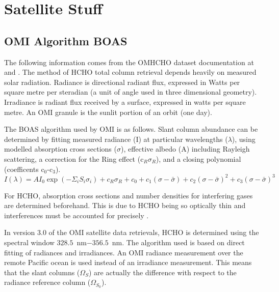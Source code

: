 \section{Satellite Stuff}
  \label{SuppNotes:Satellite}
  \subsection{OMI Algorithm BOAS}
    \label{SuppNotes:Satellite:OMI_BOAS}
    The following information comes from the OMHCHO dataset documentation at \citet{Kurosu2014} and \citet{Chance2002}.
    The method of HCHO total column retrieval depends heavily on measured solar radiation.
    Radiance is directional radiant flux, expressed in Watts per square metre per steradian (a unit of angle used in three dimensional geometry).
    Irradiance is radiant flux received by a surface, expressed in watts per square metre.
    An OMI granule is the sunlit portion of an orbit (one day).
    
    The BOAS algorithm used by OMI is as follows.
    Slant column abundance can be determined by fitting measured radiance (I) at particular wavelengths ($\lambda$), using modelled absorption cross sections ($\sigma$), effective albedo (A) including Rayleigh scattering, a correction for the Ring effect (c$_R\sigma_R$), and a closing polynomial (coefficents c$_0$-c$_3$).
    \begin{equation}
    \label{ch_HCHO:eqn:BOAS_HCHO}
    I(\lambda)  = A I_0 \exp {\left( - \Sigma_i S_i \sigma_i \right) } + c_R\sigma_R + c_0 + c_1(\sigma-\bar{\sigma}) + c_2(\sigma - \bar{\sigma})^2 + c_3(\sigma - \bar{\sigma})^3 
    \end{equation}
    
    For HCHO, absorption cross sections and number densities for interfering gases are determined beforehand.
    This is due to HCHO being so optically thin and interferences must be accounted for precisely \citep{Chance2002}.
    
    In version 3.0 of the OMI satellite data retrievals, HCHO is determined using the spectral window $328.5$~nm$ - 356.5$~nm. 
    The algorithm used is based on direct fitting of radiances and irradiances.
    An OMI radiance measurement over the remote Pacific ocean is used instead of an irradiance measurement.
    This means that the slant columns ($\Omega_S$) are actually the difference with respect to the radiance reference column ($\Omega_{S_0}$).
    

